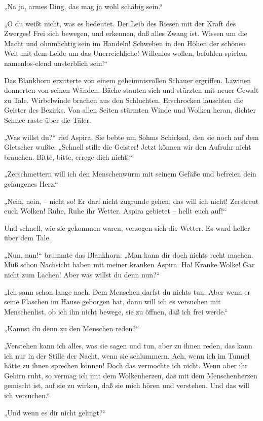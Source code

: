 „Na ja, armes Ding, das mag ja wohl schäbig sein.“

„O du weißt nicht, was es bedeutet. Der Leib des Riesen mit der
Kraft des Zwerges! Frei sich bewegen, und erkennen, daß alles Zwang
ist. Wissen um die Macht und ohnmächtig sein im Handeln! Schweben
in den Höhen der schönen Welt mit dem Leide um das Unerreichliche!
Willenlos wollen, befohlen spielen, namenlos-elend unsterblich
sein!“

Das Blankhorn erzitterte von einem geheimnisvollen Schauer
ergriffen. Lawinen donnerten von seinen Wänden. Bäche stauten sich
und stürzten mit neuer Gewalt zu Tale. Wirbelwinde brachen aus den
Schluchten. Erschrocken lauschten die Geister des Bezirks. Von
allen Seiten stürmten Winde und Wolken heran, dichter Schnee raste
über die Täler.

„Was willst du?“ rief Aspira. Sie bebte um Sohms Schicksal, den sie
noch auf dem Gletscher wußte. „Schnell stille die Geister! Jetzt
können wir den Aufruhr nicht brauchen. Bitte, bitte, errege dich
nicht!“

„Zerschmettern will ich den Menschenwurm mit seinem Gefäße und
befreien dein gefangenes Herz.“

„Nein, nein, – nicht so! Er darf nicht zugrunde gehen, das will ich
nicht! Zerstreut euch Wolken! Ruhe, Ruhe ihr Wetter. Aspira
gebietet – hellt euch auf!“

Und schnell, wie sie gekommen waren, verzogen sich die Wetter. Es
ward heller über dem Tale.

„Nun, nun!“ brummte das Blankhorn. „Man kann dir doch nichts recht
machen. Muß schon Nachsicht haben mit meiner kranken Aspira. Ha!
Kranke Wolke! Gar nicht zum Lachen! Aber was willst du denn nun?“

„Ich sann schon lange nach. Dem Menschen darfst du nichts tun. Aber
wenn er seine Flaschen im Hause geborgen hat, dann will ich es
versuchen mit Menschenlist, ob ich ihn nicht bewege, sie zu öffnen,
daß ich frei werde.“

„Kannst du denn zu den Menschen reden?“

„Verstehen kann ich alles, was sie sagen und tun, aber zu ihnen
reden, das kann ich nur in der Stille der Nacht, wenn sie
schlummern. Ach, wenn ich im Tunnel hätte zu ihnen sprechen können!
Doch das vermochte ich nicht. Wenn aber ihr Gehirn ruht, so vermag
ich mit dem Wolkenherzen, das mit dem Menschenherzen gemischt ist,
auf sie zu wirken, daß sie mich hören und verstehen. Und das will
ich versuchen.“

„Und wenn es dir nicht gelingt?“

